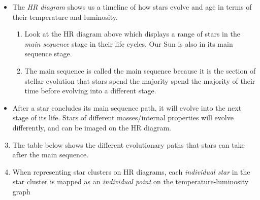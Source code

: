 \documentclass{article}
\begin{document}
    
    
    \begin{tcolorbox}[colback=white,colbacktitle=dgreen!75!white,colframe=dgreen!75!white,title=\textbf{HR-diagrams tell us at what stage in their life cycles stars are}]
    
        \begin{itemize}
            \item The \emph{\textcolor{dblue}{HR diagram}} shows us a timeline of how stars evolve and age in terms of their temperature and luminosity.
            
            
                \renewcommand{\theenumi}{\alph{enumi}}
                \begin{enumerate}
                    \item Look at the HR diagram above which displays a range of stars in the \emph{\textcolor{dblue}{main sequence}} stage in their life cycles. Our Sun is also in its main sequence stage.
        
                    \item The main sequence is called the main sequence because it is the section of stellar evolution that stars spend the majority spend the majority of their time before evolving into a different stage.
                \end{enumerate}
    
    
            \item After a star concludes its main sequence path, it will evolve into the next stage of its life. Stars of different masses/internal properties will evolve differently, and can be imaged on the HR diagram.
        \end{itemize}
        
    \end{tcolorbox}
        
        
        
    \begin{enumerate}[label=\color{dgreen}\theenumi]
    \setcounter{enumi}{2}
        \item The table below shows the different evolutionary paths that stars can take after the main sequence.
    \end{enumerate}

    
    
    \begin{enumerate}[label=\color{dgreen}\theenumi]
    \setcounter{enumi}{3}
        \item When representing star clusters on HR diagrams, each \emph{\textcolor{dblue}{individual star}} in the star cluster is mapped as an \emph{\textcolor{dblue}{individual point}} on the temperature-luminosity graph
    \end{enumerate}  
        
\end{document}
